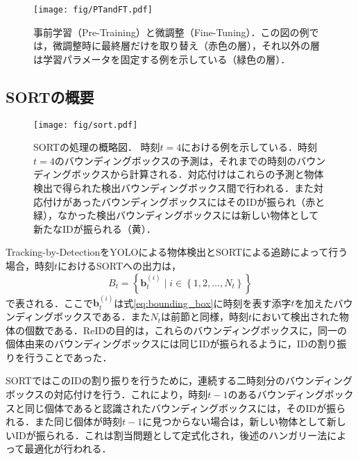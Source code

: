         \begin{figure}[t]
            \centering    
            \texttt{[image: fig/PTandFT.pdf]}
            \caption[事前学習（Pre-Training）と微調整（Fine-Tuning）]{事前学習（Pre-Training）と微調整（Fine-Tuning）．この図の例では，微調整時に最終層だけを取り替え（赤色の層），それ以外の層は学習パラメータを固定する例を示している（緑色の層）．}
            \label{fig:PTandFT}
        \end{figure}

    \subsection{SORTの概要}
    \label{subsec:abstract_of_sort}

    \begin{figure}[t]
        \centering
        \texttt{[image: fig/sort.pdf]}
        \caption[SORTの処理の概略図]{SORTの処理の概略図．
        時刻$t=4$における例を示している．時刻$t=4$のバウンディングボックスの予測は，それまでの時刻のバウンディングボックスから計算される．対応付けはこれらの予測と物体検出で得られた検出バウンディングボックス間で行われる．また対応付けがあったバウンディングボックスにはそのIDが振られ（赤と緑），なかった検出バウンディングボックスには新しい物体として新たなIDが振られる（黄）．}
        \label{fig:sort}
    \end{figure}

    Tracking-by-DetectionをYOLOによる物体検出とSORTによる追跡によって行う場合，時刻$t$におけるSORTへの出力は，
    \begin{equation}
        \label{eq:input_to_sort}
        B_t = \left\{\bm{b}_t^{(i)} \mid i \in \left\{1 ,2, \dots, N_t\right\}\right\}
    \end{equation}
    で表される．ここで$\bm{b}_t^{(i)}$は式\ref{eq:bounding_box}に時刻を表す添字$t$を加えたバウンディングボックスである．また$N_t$は前節と同様，時刻$t$において検出された物体の個数である．ReIDの目的は，これらのバウンディングボックスに，同一の個体由来のバウンディングボックスには同じIDが振られるように，IDの割り振りを行うことであった．

    SORTではこのIDの割り振りを行うために，連続する二時刻分のバウンディングボックスの対応付けを行う．これにより，時刻$t-1$のあるバウンディングボックスと同じ個体であると認識されたバウンディングボックスには，そのIDが振られる．また同じ個体が時刻$t-1$に見つからない場合は，新しい物体として新しいIDが振られる．これは割当問題として定式化され，後述のハンガリー法によって最適化が行われる．

